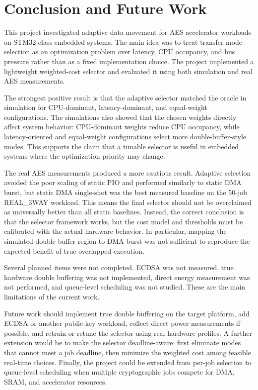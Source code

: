 \documentclass[conference]{IEEEtran}
\begin{document}
\section{Conclusion and Future Work}
This project investigated adaptive data movement for AES accelerator workloads on STM32-class embedded systems. The main idea was to treat transfer-mode selection as an optimization problem over latency, CPU occupancy, and bus pressure rather than as a fixed implementation choice. The project implemented a lightweight weighted-cost selector and evaluated it using both simulation and real AES measurements.

The strongest positive result is that the adaptive selector matched the oracle in simulation for CPU-dominant, latency-dominant, and equal-weight configurations. The simulations also showed that the chosen weights directly affect system behavior: CPU-dominant weights reduce CPU occupancy, while latency-oriented and equal-weight configurations select more double-buffer-style modes. This supports the claim that a tunable selector is useful in embedded systems where the optimization priority may change.

The real AES measurements produced a more cautious result. Adaptive selection avoided the poor scaling of static PIO and performed similarly to static DMA burst, but static DMA single-shot was the best measured baseline on the 50-job REAL\_3WAY workload. This means the final selector should not be overclaimed as universally better than all static baselines. Instead, the correct conclusion is that the selector framework works, but the cost model and thresholds must be calibrated with the actual hardware behavior. In particular, mapping the simulated double-buffer region to DMA burst was not sufficient to reproduce the expected benefit of true overlapped execution.

Several planned items were not completed. ECDSA was not measured, true hardware double buffering was not implemented, direct energy measurement was not performed, and queue-level scheduling was not studied. These are the main limitations of the current work.

Future work should implement true double buffering on the target platform, add ECDSA or another public-key workload, collect direct power measurements if possible, and retrain or retune the selector using real hardware profiles. A further extension would be to make the selector deadline-aware: first eliminate modes that cannot meet a job deadline, then minimize the weighted cost among feasible real-time choices. Finally, the project could be extended from per-job selection to queue-level scheduling when multiple cryptographic jobs compete for DMA, SRAM, and accelerator resources.
\end{document}
